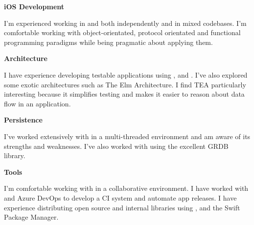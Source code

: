 \textbf{iOS Development}

I'm experienced working in  and  both
independently and in mixed codebases. I'm comfortable working with
object-orientated, protocol orientated and functional programming paradigms
while being pragmatic about applying them.

\smallskip

\textbf{Architecture}

I have experience developing testable applications using ,
 and . I've also explored some exotic architectures
such as The Elm Architecture. I find TEA particularly interesting because it
simplifies testing and makes it easier to reason about data flow in an
application.

\smallskip

\textbf{Persistence}

I've worked extensively with  in a multi-threaded environment
and am aware of its strengths and weaknesses. I've also worked with
 using the excellent GRDB library.

\smallskip

\textbf{Tools}

I'm comfortable working with  in a collaborative environment. I have
worked with  and Azure DevOps to develop a CI system and
automate app releases. I have experience distributing open source and internal
libraries using ,  and the Swift Package
Manager.

